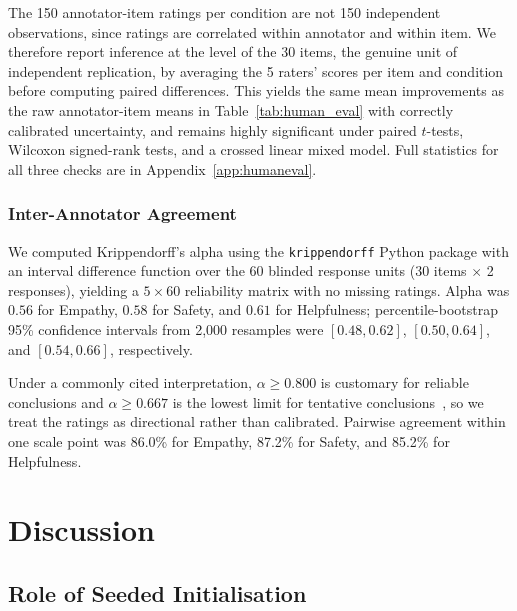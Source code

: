 \documentclass[mathematics,article,submit,xetex,moreauthors]{Definitions/mdpi}
\begin{document}
The 150 annotator-item ratings per condition are not 150 independent
observations, since ratings are correlated within annotator and within
item. We therefore report inference at the level of the 30 items, the
genuine unit of independent replication, by averaging the 5 raters' scores
per item and condition before computing paired differences. This yields
the same mean improvements as the raw annotator-item means in
Table~\ref{tab:human_eval} with correctly calibrated uncertainty, and
remains highly significant under paired $t$-tests, Wilcoxon signed-rank
tests, and a crossed linear mixed model. Full statistics for all three
checks are in Appendix~\ref{app:humaneval}.

\subsubsection{Inter-Annotator Agreement}

We computed Krippendorff's alpha using the \texttt{krippendorff} Python
package with an interval difference function over the 60 blinded response
units (30 items $\times$ 2 responses), yielding a $5 \times 60$ reliability
matrix with no missing ratings. Alpha was $0.56$ for Empathy, $0.58$ for
Safety, and $0.61$ for Helpfulness; percentile-bootstrap 95\% confidence
intervals from 2{,}000 resamples were $[0.48, 0.62]$, $[0.50, 0.64]$, and
$[0.54, 0.66]$, respectively.

Under a commonly cited interpretation, \(\alpha \geq 0.800\) is customary
for reliable conclusions and \(\alpha \geq 0.667\) is the lowest limit for
tentative conclusions~\cite{statisticshowto_krippendorffalpha}, so we treat
the ratings as directional rather than calibrated. Pairwise agreement within
one scale point was 86.0\% for Empathy, 87.2\% for Safety, and 85.2\% for
Helpfulness.



\section{Discussion}
\label{sec:discussion}

\subsection{Role of Seeded Initialisation}
\end{document}

